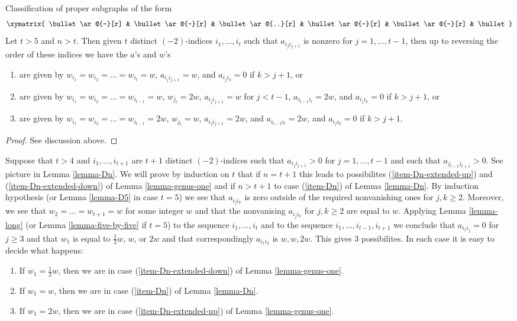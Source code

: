 \begin{lemma}
\label{lemma-long}
Classification of proper subgraphs of the form
$$
\xymatrix{
\bullet \ar@{-}[r] &
\bullet \ar@{-}[r] &
\bullet \ar@{..}[r] &
\bullet \ar@{-}[r] &
\bullet \ar@{-}[r] &
\bullet
}
$$
Let $t > 5$ and $n > t$. Then given $t$ distinct $(-2)$-indices
$i_1, \ldots, i_t$ such that $a_{i_ji_{j + 1}}$ is nonzero for
$j = 1, \ldots, t - 1$, then up to reversing the order of these indices
we have the $a$'s and $w$'s
\begin{enumerate}
\item
\label{item-An}
are given by $w_{i_1} = w_{i_2} = \ldots = w_{i_t} = w$,
$a_{i_ji_{j + 1}} = w$, and $a_{i_ji_k} = 0$ if $k > j + 1$, or
\item
\label{item-Cn}
are given by $w_{i_1} = w_{i_2} = \ldots = w_{i_{t - 1}} = w$,
$w_{j_t} = 2w$, $a_{i_ji_{j + 1}} = w$ for $j < t - 1$,
$a_{i_{t - 1}i_t} = 2w$, and $a_{i_ji_k} = 0$ if $k > j + 1$, or
\item
\label{item-Bn}
are given by $w_{i_1} = w_{i_2} = \ldots = w_{i_{t - 1}} = 2w$,
$w_{j_t} = w$, $a_{i_ji_{j + 1}} = 2w$, and
$a_{i_{t - 1}i_t} = 2w$, and $a_{i_ji_k} = 0$ if $k > j + 1$.
\end{enumerate}
\end{lemma}

\begin{proof}
See discussion above.
\end{proof}

\noindent
Suppose that $t > 4$ and $i_1, \ldots, i_{t + 1}$ are $t + 1$
distinct $(-2)$-indices such that $a_{i_ji_{j + 1}} > 0$
for $j = 1, \ldots, t - 1$ and such that $a_{j_{t - 1}j_{t + 1}} > 0$.
See picture in Lemma \ref{lemma-Dn}. We will prove by induction on $t$
that if $n = t + 1$ this leads to possibilites
(\ref{item-Dn-extended-up}) and (\ref{item-Dn-extended-down})
of Lemma \ref{lemma-genus-one} and if $n > t + 1$ to
case (\ref{item-Dn}) of Lemma \ref{lemma-Dn}.
By induction hypothesis (or Lemma \ref{lemma-D5} in case $t = 5$)
we see that $a_{i_ji_k}$ is zero outside of the required
nonvanishing ones for $j, k \geq 2$.
Moreover, we see that $w_2 = \ldots = w_{t + 1} = w$ for some integer
$w$ and that the nonvanising $a_{i_ji_k}$ for $j, k \geq 2$ are
equal to $w$. Applying Lemma \ref{lemma-long}
(or Lemma \ref{lemma-five-by-five} if $t = 5$) to the sequence
$i_1, \ldots, i_t$ and to the sequence
$i_1, \ldots, i_{t - 1}, i_{t + 1}$ we conclude that
$a_{i_1 i_j} = 0$ for $j \geq 3$ and that
$w_1$ is equal to $\frac{1}{2}w$, $w$, or $2w$
and that correspondingly $a_{i_1i_2}$ is $w, w, 2w$.
This gives $3$ possibilites. In each case it is easy to
decide what happens:
\begin{enumerate}
\item If $w_1 = \frac{1}{2}w$, then we are in case
(\ref{item-Dn-extended-down}) of Lemma \ref{lemma-genus-one}.
\item If $w_1 = w$, then we are in case
(\ref{item-Dn}) of Lemma \ref{lemma-Dn}.
\item If $w_1 = 2w$, then we are in case
(\ref{item-Dn-extended-up}) of Lemma \ref{lemma-genus-one}.
\end{enumerate}

